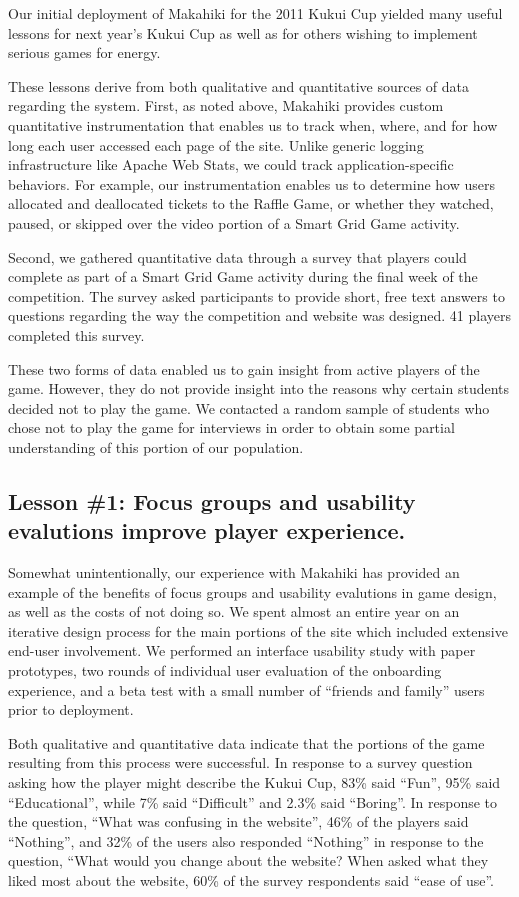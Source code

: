 \documentclass{acm_proc_article-sp}
\begin{document}
Our initial deployment of Makahiki for the 2011 Kukui Cup yielded many
useful lessons for next year's Kukui Cup as well as for others wishing to
implement serious games for energy. 

These lessons derive from both qualitative and quantitative sources of data
regarding the system.  First, as noted above, Makahiki provides custom quantitative
instrumentation that enables us to track when, where, and for how long each
user accessed each page of the site.  Unlike generic logging infrastructure
like Apache Web Stats, we could track application-specific behaviors. For
example, our instrumentation enables us to determine how users allocated
and deallocated tickets to the Raffle Game, or whether they watched,
paused, or skipped over the video portion of a Smart Grid Game activity.

Second, we gathered quantitative data through a survey that players could
complete as part of a Smart Grid Game activity during the final week of the
competition. The survey asked participants to provide short, free text
answers to questions regarding the way the competition and website was
designed.   41 players completed this survey.

These two forms of data enabled us to gain insight from active players of
the game.  However, they do not provide insight into the reasons why
certain students decided not to play the game.  We contacted a random
sample of students who chose not to play the game for interviews in order
to obtain some partial understanding of this portion of our population.

\subsection{Lesson \#1: Focus groups and usability evalutions improve player
  experience.}

Somewhat unintentionally, our experience with Makahiki has provided an
example of the benefits of focus groups and usability evalutions in game
design, as well as the costs of not doing so.  We spent almost an entire
year on an iterative design process for the main portions of the site which
included extensive end-user involvement.  We performed an interface
usability study with paper prototypes, two rounds of individual user
evaluation of the onboarding experience, and a beta test with a small
number of ``friends and family'' users prior to deployment.

Both qualitative and quantitative data indicate that the portions of the
game resulting from this process were successful.  In response to a survey
question asking how the player might describe the Kukui Cup, 83\% said
``Fun'', 95\% said ``Educational'', while 7\% said ``Difficult'' and 2.3\%
said ``Boring''.  In response to the question, ``What was confusing in the
website'', 46\% of the players said ``Nothing'', and 32\% of the users also
responded ``Nothing'' in response to the question, ``What would you change
about the website? When asked what they liked most about the website, 60\%
of the survey respondents said ``ease of use''.
\end{document}
